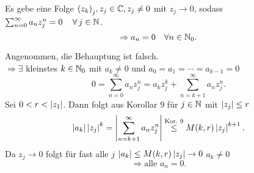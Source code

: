 \documentclass[../ana1.tex]{subfiles}
\begin{document}
\begin{satz}
    Es gebe eine Folge \( {(z_k)}_j, z_j \in\mathbb{C}, z_j \neq 0 \) mit \( z_j \rightarrow 0 \), sodass \( \sum_{n=0}^\infty a_n z_j^n = 0 \quad \,\forall \, j\in\mathbb{N} \).
    \[ \Rightarrow a_n = 0 \quad \forall n\in\mathbb{N}_0. \]
\end{satz}
\begin{bew}
    Angenommen, die Behauptung ist falsch. \\
    \( \Rightarrow \exists \) kleinstes \( k\in\mathbb{N}_0 \) mit \(a_k \neq 0 \) und \( a_0 = a_1 = \cdots = a_{k-1} = 0 \)
    \[ 0 = \sum_{n=0}^\infty a_n z_j^n = a_k z_j^k + \sum_{n=k+1}^\infty a_n z_j^n. \]
    Sei \( 0 < r < \left|z_1\right| \). Dann folgt aus Korollar 9 für \( j\in\mathbb{N} \) mit \( \left|z_j\right| \leq r \)
    \[ \left|a_k\right| \left|z_j\right|^k = \left| \sum_{n=k+1}^\infty a_n z_j^n \right| \overset{\text{Kor.\ 9}}{\leq} M(k,r) \left|z_j\right|^{k+1}. \]
    Da \( z_j\rightarrow 0 \) folgt für fast alle \( j \)
    \( \left| a_k \right| \leq M(k,r) \left|z_j\right| \rightarrow 0 \) \Lightning{} \(a_k \neq 0\)
    \[ \Rightarrow \text{alle } a_n = 0. \]
\end{bew}
\end{document}
